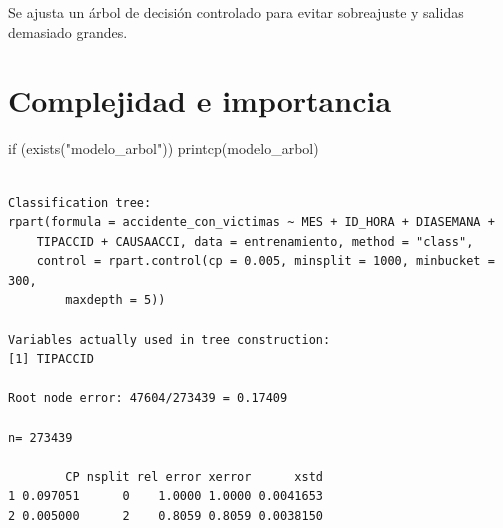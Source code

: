 \documentclass[
  spanish,
  11pt,
  letterpaper,
]{book}
\newenvironment{Shaded}{}{}
\newcommand{\ControlFlowTok}[1]{\textcolor[rgb]{0.84,0.23,0.29}{#1}}
\newcommand{\FunctionTok}[1]{\textcolor[rgb]{0.44,0.26,0.76}{#1}}
\newcommand{\NormalTok}[1]{\textcolor[rgb]{0.14,0.16,0.18}{#1}}
\newcommand{\StringTok}[1]{\textcolor[rgb]{0.01,0.18,0.38}{#1}}
\begin{document}
\begin{tcolorbox}[enhanced jigsaw, arc=.35mm, bottomrule=.15mm, bottomtitle=1mm, breakable, colback=white, colbacktitle=quarto-callout-note-color!10!white, colframe=quarto-callout-note-color-frame, coltitle=black, left=2mm, leftrule=.75mm, opacityback=0, opacitybacktitle=0.6, rightrule=.15mm, title=\textcolor{quarto-callout-note-color}{\faInfo}\hspace{0.5em}{Explicación del código}, titlerule=0mm, toprule=.15mm, toptitle=1mm]

Se ajusta un árbol de decisión controlado para evitar sobreajuste y
salidas demasiado grandes.

\end{tcolorbox}

\section{Complejidad e importancia}\label{complejidad-e-importancia}

\begin{Shaded}
\begin{Highlighting}[]
\ControlFlowTok{if}\NormalTok{ (}\FunctionTok{exists}\NormalTok{(}\StringTok{"modelo\_arbol"}\NormalTok{)) }\FunctionTok{printcp}\NormalTok{(modelo\_arbol)}
\end{Highlighting}
\end{Shaded}

\begin{verbatim}

Classification tree:
rpart(formula = accidente_con_victimas ~ MES + ID_HORA + DIASEMANA + 
    TIPACCID + CAUSAACCI, data = entrenamiento, method = "class", 
    control = rpart.control(cp = 0.005, minsplit = 1000, minbucket = 300, 
        maxdepth = 5))

Variables actually used in tree construction:
[1] TIPACCID

Root node error: 47604/273439 = 0.17409

n= 273439 

        CP nsplit rel error xerror      xstd
1 0.097051      0    1.0000 1.0000 0.0041653
2 0.005000      2    0.8059 0.8059 0.0038150
\end{verbatim}
\end{document}
